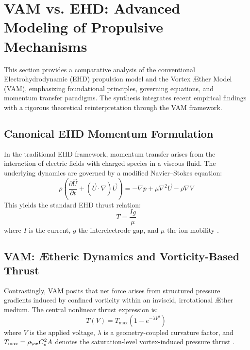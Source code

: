 
\section{VAM vs. EHD: Advanced Modeling of Propulsive Mechanisms}


This section provides a comparative analysis of the conventional Electrohydrodynamic (EHD) propulsion model and the Vortex \AE{}ther Model (VAM), emphasizing foundational principles, governing equations, and momentum transfer paradigms. The synthesis integrates recent empirical findings \cite{ehdreview2023} \cite{ehdpropeller2023} \cite{electricfluidsetup2023} \cite{ehdmodeling2023} with a rigorous theoretical reinterpretation through the VAM framework.


\subsection{Canonical EHD Momentum Formulation}
In the traditional EHD framework, momentum transfer arises from the interaction of electric fields with charged species in a viscous fluid. The underlying dynamics are governed by a modified Navier--Stokes equation:
\begin{equation}
\rho \left( \frac{\partial \vec{U}}{\partial t} + (\vec{U} \cdot \nabla)\vec{U} \right) = -\nabla p + \mu \nabla^2 \vec{U} - \rho \nabla V
\end{equation}
This yields the standard EHD thrust relation:
\begin{equation}
T = \frac{I g}{\mu}
\end{equation}
where $I$ is the current, $g$ the interelectrode gap, and $\mu$ the ion mobility \cite{ehdreview2023}.


\subsection{VAM: Ætheric Dynamics and Vorticity-Based Thrust}
Contrastingly, VAM posits that net force arises from structured pressure gradients induced by confined vorticity within an inviscid, irrotational \AE{}ther medium. The central nonlinear thrust expression is:
\begin{equation}
T(V) = T_\text{max}(1 - e^{-\lambda V^2})
\end{equation}
where $V$ is the applied voltage, $\lambda$ is a geometry-coupled curvature factor, and $T_\text{max} = \rho_{\ae} C_e^2 A$ denotes the saturation-level vortex-induced pressure thrust \cite{vamderive2024}.


